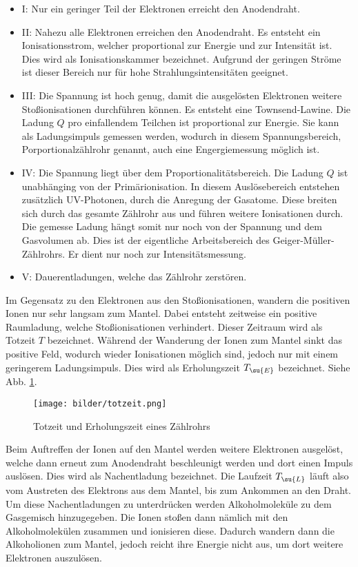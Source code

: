 \begin{itemize}
  \item{I: Nur ein geringer Teil der Elektronen erreicht den Anodendraht.} \\
  \item{II: Nahezu alle Elektronen erreichen den Anodendraht. Es entsteht ein
  Ionisationsstrom, welcher proportional zur Energie und zur Intensität ist. Dies
  wird als Ionisationskammer bezeichnet. Aufgrund der geringen Ströme ist dieser Bereich
  nur für hohe Strahlungsintensitäten geeignet.} \\
  \item{III: Die Spannung ist hoch genug, damit die ausgelösten Elektronen weitere
  Stoßionisationen durchführen können. Es entsteht eine Townsend-Lawine. Die Ladung $Q$
  pro einfallendem Teilchen
  ist proportional zur Energie. Sie kann als Ladungsimpuls gemessen werden, wodurch
  in diesem Spannungsbereich, Porportionalzählrohr genannt, auch eine Engergiemessung
  möglich ist.} \\
  \item{IV: Die Spannung liegt über dem Proportionalitätsbereich. Die Ladung $Q$ ist
  unabhänging von der Primärionisation. In diesem Auslösebereich entstehen zusätzlich
  UV-Photonen, durch die Anregung der Gasatome. Diese breiten sich durch das gesamte
  Zählrohr aus und führen weitere Ionisationen durch. Die gemesse Ladung hängt somit
  nur noch von der Spannung und dem Gasvolumen ab. Dies ist der eigentliche Arbeitsbereich
  des Geiger-Müller-Zählrohrs. Er dient nur noch zur Intensitätsmessung.} \\
  \item{V: Dauerentladungen, welche das Zählrohr zerstören.}
\end{itemize}
Im Gegensatz zu den Elektronen aus den Stoßionisationen, wandern die positiven Ionen
nur sehr langsam zum Mantel. Dabei entsteht zeitweise ein positive Raumladung, welche
Stoßionisationen verhindert. Dieser Zeitraum wird als Totzeit $T$ bezeichnet. Während
der Wanderung der Ionen zum Mantel sinkt das positive Feld, wodurch wieder Ionisationen
möglich sind, jedoch nur mit einem geringerem Ladungsimpuls. Dies wird als Erholungszeit
$T_\su{E}$ bezeichnet. Siehe Abb. \ref{fig:totzeit}.
\begin{figure}
  \centering
  \texttt{[image: bilder/totzeit.png]}
  \caption{Totzeit und Erholungszeit eines Zählrohrs \cite{703}}
  \label{fig:totzeit}
\end{figure}
Beim Auftreffen der Ionen auf den Mantel werden weitere Elektronen ausgelöst, welche
dann erneut zum Anodendraht beschleunigt werden und dort einen Impuls auslösen. Dies
wird als Nachentladung bezeichnet. Die Laufzeit $T_\su{L}$ läuft also vom Austreten
des Elektrons aus dem Mantel, bis zum Ankommen an den Draht. Um diese Nachentladungen zu
unterdrücken werden Alkoholmoleküle zu dem Gasgemisch hinzugegeben. Die Ionen stoßen
dann nämlich mit den Alkoholmolekülen zusammen und ionisieren diese. Dadurch
wandern dann die Alkoholionen zum Mantel, jedoch reicht ihre Energie nicht aus, um dort
weitere Elektronen auszulösen. 
